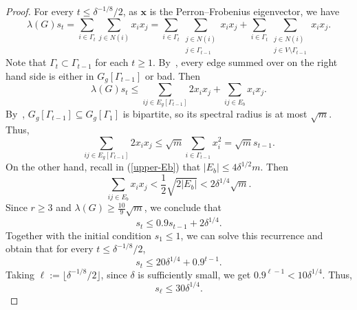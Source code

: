 \documentclass[11pt,a4paper]{article}
\theoremstyle{definition}
\theoremstyle{remark}
\newcommand{\floor}[1]{\lfloor #1\rfloor}
\newcommand*{\abs}[1]{\lvert#1\rvert}
\begin{document}
\begin{proof}
    
    For every $t \le \delta^{-1/8} / 2$, as $\bm{x}$ is the Perron--Frobenius eigenvector, we have
    $$\lambda(G) s_t = \sum_{i \in \Gamma_t} \sum_{j \in N(i)} x_i x_j 
    =\sum_{i \in \Gamma_t} \sum_{\substack{j \in N(i)\\ j\in \Gamma_{t-1}}} x_ix_j + 
    \sum_{i \in \Gamma_t} \sum_{\substack{j \in N(i)\\ j\in V\setminus \Gamma_{t-1}}} x_ix_j.$$
    Note that $\Gamma_t \subset \Gamma_{t-1}$ for each $t\ge 1$. 
    By~, every edge summed over on the right hand side is either in $G_g[\Gamma_{t - 1}]$ or bad. Then 
    $$\lambda(G) s_t \leq \sum_{ij \in E_g[\Gamma_{t - 1}]} 2x_i x_j + \sum_{ij \in E_b} x_i x_j.$$
    By~, $G_g[\Gamma_{t - 1}]\subseteq G_g[\Gamma_{1}]$ is bipartite, so its spectral radius is at most $\sqrt{m}$. Thus, 
    $$\sum_{ij \in E_g[\Gamma_{t - 1}]} 2x_i x_j \leq \sqrt{m}\sum_{i \in \Gamma_{t - 1}} x_i^2 = \sqrt{m} s_{t - 1}.$$
    On the other hand, recall in (\ref{upper-Eb}) that  
    $|E_b|\le 4\delta^{1/2}m$. Then    
    $$\sum_{ij \in E_b} x_i x_j < \frac{1}{2} \sqrt{2 \abs{E_b}} < 2 \delta^{1/4} \sqrt{m}.$$
    Since $r\ge 3$ and $\lambda(G) \geq \frac{10}{9} \sqrt{m}$, we conclude that
    $$s_t \leq 0.9 s_{t - 1} + 2\delta^{1/4}.$$
    Together with the initial condition $s_1 \leq 1$, we can solve this recurrence and obtain that for every $t \leq \delta^{-1/8} / 2$, 
    $$s_t \leq 20 \delta^{1/4} + 0.9^{t - 1}.$$
    Taking $\ell := \floor{\delta^{-1/8}/2}$, since  $\delta$ is sufficiently small, we get $0.9^{\ell -1} < 10 \delta^{1/4}$. Thus, 
    \begin{equation} \label{eq-sl}
    s_{\ell} \leq 30 \delta^{1/4}.
    \end{equation}
    

\end{proof}
\end{document}
